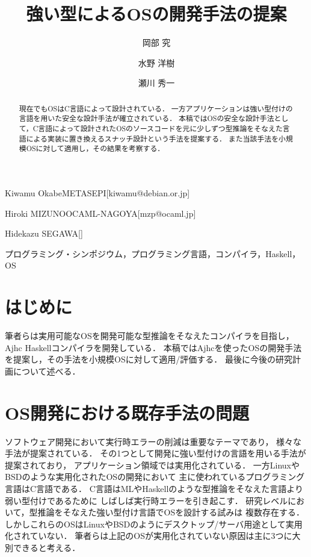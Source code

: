 \documentclass[submit,techreq,noauthor]{ipsj}
\begin{document}
\title{強い型によるOSの開発手法の提案}


\author{岡部 究}{Kiwamu Okabe}{METASEPI}[kiwamu@debian.or.jp]
\author{水野 洋樹}{Hiroki MIZUNO}{OCAML-NAGOYA}[mzp@ocaml.jp]
\author{瀬川 秀一}{Hidekazu SEGAWA}{}[]

\begin{abstract}
現在でもOSはC言語によって設計されている．
一方アプリケーションは強い型付けの言語を用いた安全な設計手法が確立されている．
本稿ではOSの安全な設計手法として，C言語によって設計されたOSのソースコードを元に少しずつ型推論をそなえた言語による実装に置き換えるスナッチ設計という手法を提案する．
また当該手法を小規模OSに対して適用し，その結果を考察する．
\end{abstract}

\begin{jkeyword}
プログラミング・シンポジウム，プログラミング言語，コンパイラ，Haskell，OS
\end{jkeyword}

\maketitle

\section{はじめに}

筆者らは実用可能なOSを開発可能な型推論をそなえたコンパイラを目指し，
Ajhc Haskellコンパイラ\cite{ajhc}を開発している．
本稿ではAjhcを使ったOSの開発手法を提案し，その手法を小規模OSに対して適用/評価する．
最後に今後の研究計画について述べる．

\section{OS開発における既存手法の問題}
\label{sec:problems}

ソフトウェア開発において実行時エラーの削減は重要なテーマであり，
様々な手法が提案されている．
その1つとして開発に強い型付けの言語を用いる手法が提案されており，
アプリケーション領域では実用化されている．
一方LinuxやBSDのような実用化されたOSの開発において
主に使われているプログラミング言語はC言語である．
C言語はMLやHaskellのような型推論をそなえた言語より弱い型付けであるために
しばしば実行時エラーを引き起こす．
研究レベルにおいて，型推論をそなえた強い型付け言語でOSを設計する試みは
複数存在する\cite{funk}\cite{snowflake-os}\cite{house}．
しかしこれらのOSはLinuxやBSDのようにデスクトップ/サーバ用途として実用化されていない．
筆者らは上記のOSが実用化されていない原因は主に3つに大別できると考える．
\end{document}
